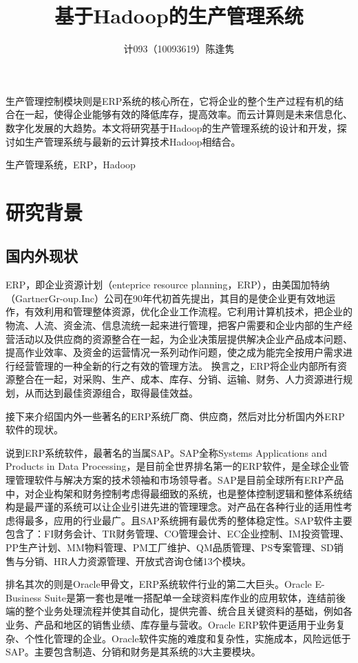 \documentclass{Proposal}
\begin{document}
\title{基于Hadoop的生产管理系统}
\author{计093（10093619）陈逢隽}
\date{}
\maketitle
\thispagestyle{fancy}
\ECUSTabstract 生产管理控制模块则是ERP系统的核心所在，它将企业的整个生产过程有机的结合在一起，使得企业能够有效的降低库存，提高效率。而云计算则是未来信息化、数字化发展的大趋势。本文将研究基于Hadoop的生产管理系统的设计和开发，探讨如生产管理系统与最新的云计算技术Hadoop相结合。

\ECUSTkeywords 生产管理系统，ERP，Hadoop

\section{研究背景}

\subsection{国内外现状}

ERP，即企业资源计划（enteprice resource planning，ERP），由美国加特纳（GartnerGr-oup.Inc）公司在90年代初首先提出，其目的是使企业更有效地运作，有效利用和管理整体资源，优化企业工作流程。它利用计算机技术，把企业的物流、人流、资金流、信息流统一起来进行管理，把客户需要和企业内部的生产经营活动以及供应商的资源整合在一起，为企业决策层提供解决企业产品成本问题、提高作业效率、及资金的运营情况一系列动作问题，使之成为能完全按用户需求进行经营管理的一种全新的行之有效的管理方法。 换言之，ERP将企业内部所有资源整合在一起，对采购、生产、成本、库存、分销、运输、财务、人力资源进行规划，从而达到最佳资源组合，取得最佳效益。

接下来介绍国内外一些著名的ERP系统厂商、供应商，然后对比分析国内外ERP软件的现状。

说到ERP系统软件，最著名的当属SAP。SAP全称Systems Applications and Products in Data Processing，是目前全世界排名第一的ERP软件，是全球企业管理管理软件与解决方案的技术领袖和市场领导者。SAP是目前全球所有ERP产品中，对企业构架和财务控制考虑得最细致的系统，也是整体控制逻辑和整体系统结构是最严谨的系统可以让企业引进先进的管理理念。对产品在各种行业的适用性考虑得最多，应用的行业最广。且SAP系统拥有最优秀的整体稳定性。SAP软件主要包含了：FI财务会计、TR财务管理、CO管理会计、EC企业控制、IM投资管理、PP生产计划、MM物料管理、PM工厂维护、QM品质管理、PS专案管理、SD销售与分销、HR人力资源管理、开放式咨询仓储13个模块。

排名其次的则是Oracle甲骨文，ERP系统软件行业的第二大巨头。Oracle E-Business Suite是第一套也是唯一搭配单一全球资料库作业的应用软体，连结前後端的整个业务处理流程并使其自动化，提供完善、统合且关键资料的基础，例如各业务、产品和地区的销售业绩、库存量与营收。Oracle ERP软件更适用于业务复杂、个性化管理的企业。Oracle软件实施的难度和复杂性，实施成本，风险远低于SAP。主要包含制造、分销和财务是其系统的3大主要模块。
\end{document}
